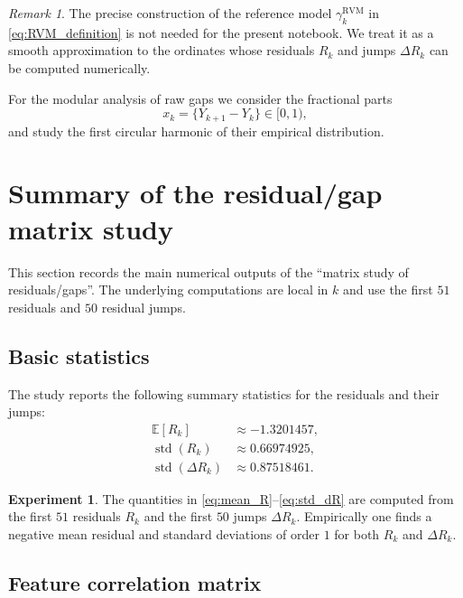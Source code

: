 \documentclass[11pt]{amsart}
\numberwithin{equation}{section}
\theoremstyle{plain}
\theoremstyle{definition}
\newtheorem{experiment}[theorem]{Experiment}
\theoremstyle{remark}
\newtheorem{remark}[theorem]{Remark}
\begin{document}
\begin{remark}
\label{rem:RVM_informal}
The precise construction of the reference model
$\gamma_k^{\mathrm{RVM}}$ in \eqref{eq:RVM_definition}
is not needed for the present notebook.
We treat it as a smooth approximation to the ordinates
whose residuals $R_k$ and jumps $\Delta R_k$ can be computed numerically.
\end{remark}

For the modular analysis of raw gaps we consider the fractional parts
\begin{equation}
x_k = \{ Y_{k+1} - Y_k \} \in [0,1),
\label{eq:xk_definition}
\end{equation}
and study the first circular harmonic of their empirical distribution.

\section{Summary of the residual/gap matrix study}
\label{sec:matrix_study_summary}

This section records the main numerical outputs of the
``matrix study of residuals/gaps''.
The underlying computations are local in $k$ and use
the first $51$ residuals and $50$ residual jumps.

\subsection{Basic statistics}
\label{subsec:basic_statistics}

The study reports the following summary statistics for the residuals
and their jumps:
\begin{align}
\mathbb{E}[R_k] &\approx -1.3201457,
\label{eq:mean_R}\\
\operatorname{std}(R_k) &\approx 0.66974925,
\label{eq:std_R}\\
\operatorname{std}(\Delta R_k) &\approx 0.87518461.
\label{eq:std_dR}
\end{align}

\begin{experiment}
\label{exp:residual_basic_stats}
The quantities in \eqref{eq:mean_R}--\eqref{eq:std_dR}
are computed from the first $51$ residuals $R_k$
and the first $50$ jumps $\Delta R_k$.
Empirically one finds a negative mean residual and
standard deviations of order $1$ for both $R_k$ and $\Delta R_k$.
\end{experiment}

\subsection{Feature correlation matrix}
\label{subsec:feature_correlation}
\end{document}
